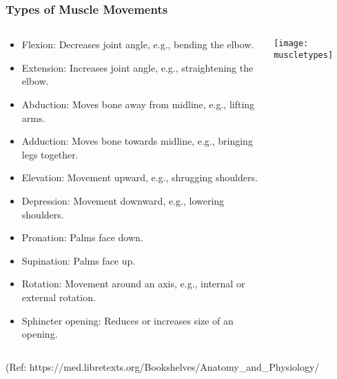\begin{frame}[fragile]\frametitle{Types of Muscle Movements}
\begin{columns}
    \begin{column}[T]{0.75\linewidth}
      \begin{itemize}
		\item Flexion: Decreases joint angle, e.g., bending the elbow.
		\item Extension: Increases joint angle, e.g., straightening the elbow.
		\item Abduction: Moves bone away from midline, e.g., lifting arms.
		\item Adduction: Moves bone towards midline, e.g., bringing legs together.
		\item Elevation: Movement upward, e.g., shrugging shoulders.
		\item Depression: Movement downward, e.g., lowering shoulders.
		\item Pronation: Palms face down.
		\item Supination: Palms face up.
		\item Rotation: Movement around an axis, e.g., internal or external rotation.
		\item Sphincter opening: Reduces or increases size of an opening.
	  \end{itemize}
    \end{column}
    \begin{column}[T]{0.25\linewidth}
		\begin{center}
		\texttt{[image: muscletypes]}
				
		\end{center}	
    \end{column}
  \end{columns}
  
		{\tiny (Ref: https://med.libretexts.org/Bookshelves/Anatomy\_and\_Physiology/}		
  
\end{frame}


